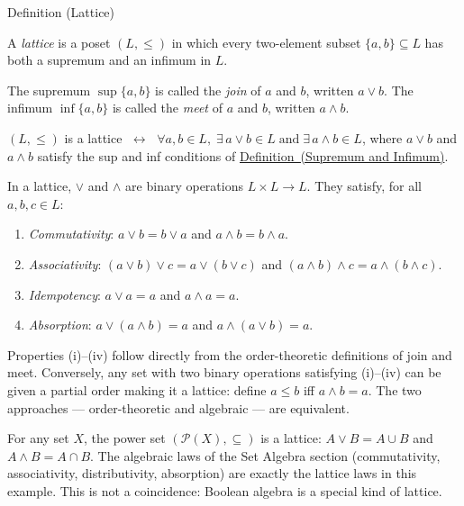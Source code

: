 
\begin{definitionbox}{Definition (Lattice)}
\begin{definition}[Lattice]\label{def:lattice}
A \emph{lattice} is a poset $(L, \leq)$ in which every two-element subset
$\{a, b\} \subseteq L$ has both a supremum and an infimum in $L$.

The supremum $\sup\{a,b\}$ is called the \emph{join} of $a$ and $b$,
written $a \vee b$.
The infimum $\inf\{a,b\}$ is called the \emph{meet} of $a$ and $b$,
written $a \wedge b$.
\end{definition}
\end{definitionbox}\begin{remark*}
$(L, \leq)$ is a lattice $\;\leftrightarrow\;$
$\forall a, b \in L,\;\exists\, a \vee b \in L \;\text{and}\; \exists\, a \wedge b \in L$,
where $a \vee b$ and $a \wedge b$ satisfy the sup and inf conditions of
\hyperref[def:sup-inf]{Definition~(Supremum and Infimum)}.
\end{remark*}

\begin{remark*}
\label{rem:lattice-operations}
In a lattice, $\vee$ and $\wedge$ are binary operations $L \times L \to L$.
They satisfy, for all $a, b, c \in L$:
\begin{enumerate}[label=(\roman*)]
  \item \emph{Commutativity}: $a \vee b = b \vee a$ and $a \wedge b = b \wedge a$.
  \item \emph{Associativity}: $(a \vee b) \vee c = a \vee (b \vee c)$ and
        $(a \wedge b) \wedge c = a \wedge (b \wedge c)$.
  \item \emph{Idempotency}: $a \vee a = a$ and $a \wedge a = a$.
  \item \emph{Absorption}: $a \vee (a \wedge b) = a$ and
        $a \wedge (a \vee b) = a$.
\end{enumerate}
Properties (i)--(iv) follow directly from the order-theoretic definitions of join
and meet.  Conversely, any set with two binary operations satisfying (i)--(iv)
can be given a partial order making it a lattice: define $a \leq b$ iff
$a \wedge b = a$.  The two approaches --- order-theoretic and algebraic --- are
equivalent.
\end{remark*}

\begin{example*}
\label{ex:power-set-lattice}
For any set $X$, the power set $(\mathcal{P}(X), \subseteq)$ is a lattice:
$A \vee B = A \cup B$ and $A \wedge B = A \cap B$.  The algebraic laws
of the Set Algebra section (commutativity, associativity, distributivity,
absorption) are exactly the lattice laws in this example.  This is not a
coincidence: Boolean algebra is a special kind of lattice.
\end{example*}

